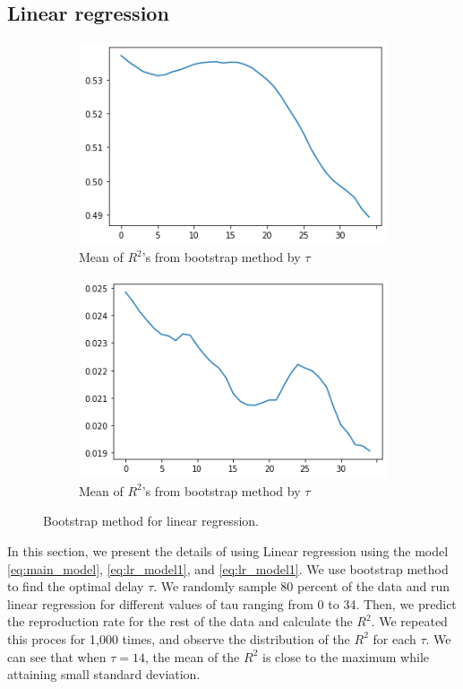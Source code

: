 \documentclass[11pt]{article}
\begin{document}
\subsection{Linear regression}
\begin{figure}[ht]
     \centering
     \begin{subfigure}[b]{0.45\textwidth}
         \centering
         \includegraphics[width=\textwidth]{lr_bootstrap_mean.png}
         \caption{Mean of $R^2$'s from bootstrap method by $\tau$}
         \label{fig:lr_bootstrap_mean}
     \end{subfigure}
     \begin{subfigure}[b]{0.45\textwidth}
         \centering
         \includegraphics[width=\textwidth]{lr_bootstrap_std.png}
         \caption{Mean of $R^2$'s from bootstrap method by $\tau$}
         \label{fig:lr_bootstrap_std}
     \end{subfigure}
     \caption{Bootstrap method for linear regression.}
\end{figure}
In this section, we present the details of using Linear regression using the model \eqref{eq:main_model}, \eqref{eq:lr_model1}, and \eqref{eq:lr_model1}. We use bootstrap method to find the optimal delay $\tau$. We randomly sample 80 percent of the data and run linear regression for different values of tau ranging from 0 to 34. Then, we predict the reproduction rate for the rest of the data and calculate the $R^2$. We repeated this proces for 1,000 times, and observe the distribution of the $R^2$ for each $\tau$. We can see that when $\tau=14$, the mean of the $R^2$ is close to the maximum while attaining small standard deviation.
\end{document}
